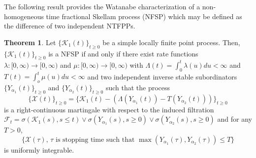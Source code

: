 \documentclass[11pt,oneside,reqno]{amsart}
\theoremstyle{definition}
\newtheorem{theorem}{\bf Theorem}[section]
\theoremstyle{remarkstyle}
\begin{document}
The following result provides the Watanabe characterization of a non-homogeneous time fractional Skellam process (NFSP) which may be defined as the difference of two independent NTFPPs.  
\begin{theorem}\label{Watanabe_characterization_NFSP}
    Let $\{\mathcal{K}_1(t)\}_{t\ge 0}$ be a simple locally finite point process. Then, $\{\mathcal{K}_1(t)\}_{t\ge 0}$ is a NFSP if and only if there exist rate functions $\lambda:[0,\infty)\to[0,\infty)$ and $\mu:[0,\infty)\to[0,\infty)$ with $\Lambda(t)=\int_{0}^{t}\lambda(u)du<\infty$ and $T(t)=\int_{o}^{t}\mu(u)du<\infty$ and two independent inverse stable subordinators $\{Y_{\alpha_1}(t)\}_{t\ge 0}$ and $\{Y_{\alpha_2}(t)\}_{t\ge 0}$ such that the process 
    \begin{equation}\label{martingale_form_nfsp}
    \{\mathcal{X}(t)\}_{t\ge 0}=\{\mathcal{K}_1(t)-\left(\Lambda(Y_{\alpha_1}(t))-T(Y_{\alpha_2}(t))\right)\}_{t\ge 0}    
    \end{equation} 
    is a right-continuous martingale with respect to the induced filtration $\mathcal{F}_t=\sigma\left(\mathcal{K}_1(s),s\le t\right)\vee\sigma\left(Y_{\alpha_1}(s), s\ge 0\right)\vee\sigma\left(Y_{\alpha_2}(s), s\ge 0\right)$ and for any $T>0$,
    \begin{equation}\label{stopping_times_martingale_nfsp}
        \{\mathcal{X}(\tau),\,\tau\,\, \text{is stopping time such that}\,\,\max\left(Y_{\alpha_1}(\tau),Y_{\alpha_2}(\tau)\right)\le T\}
    \end{equation}
    is uniformly integrable.
\end{theorem}
\end{document}
